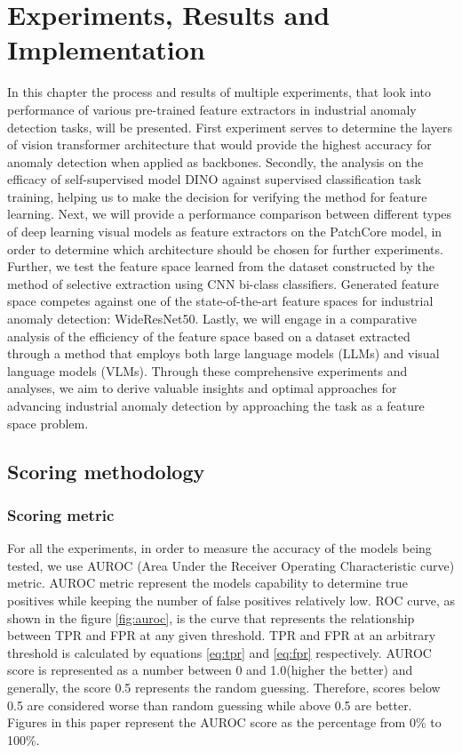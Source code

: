 \chapter{Experiments, Results and Implementation}
\label{chapter:ch4}

In this chapter the process and results of multiple experiments, that look into performance of various pre-trained feature extractors in industrial anomaly detection tasks, will be presented. First experiment serves to determine the layers of vision transformer\cite{vit} architecture that would provide the highest accuracy for anomaly detection when applied as backbones. Secondly, the analysis on the efficacy of self-supervised model DINO\cite{dino} against supervised classification task training, helping us to make the decision for verifying the method for feature learning. Next, we will provide a performance comparison between different types of deep learning visual models as feature extractors on the PatchCore\cite{patchcore} model, in order to determine which architecture should be chosen for further experiments. Further, we test the feature space learned from the dataset constructed by the method of selective extraction using CNN bi-class classifiers. Generated feature space competes against one of the state-of-the-art feature spaces for industrial anomaly detection: WideResNet50\cite{wideresnet}. Lastly, we will engage in a comparative analysis of the efficiency of the feature space based on a dataset extracted through a method that employs both large language models (LLMs) and visual language models (VLMs). Through these comprehensive experiments and analyses, we aim to derive valuable insights and optimal approaches for advancing industrial anomaly detection by approaching the task as a feature space problem.

\section{Scoring methodology}

\subsection{Scoring metric}
For all the experiments, in order to measure the accuracy of the models being tested, we use AUROC (Area Under the Receiver Operating Characteristic curve) metric\cite{auroc}. AUROC metric represent the models capability to determine true positives while keeping the number of false positives relatively low\cite{auroc}. ROC curve, as shown in the figure \ref{fig:auroc}, is the curve that represents the relationship between TPR and FPR at any given threshold. TPR and FPR at an arbitrary threshold is calculated by equations \ref{eq:tpr} and \ref{eq:fpr} respectively\cite{auroc}. AUROC score is represented as a number between 0 and 1.0(higher the better) and generally, the score 0.5 represents the random guessing. Therefore, scores below 0.5 are considered worse than random guessing while above 0.5 are better. Figures in this paper represent the AUROC score as the percentage from 0\% to 100\%.

